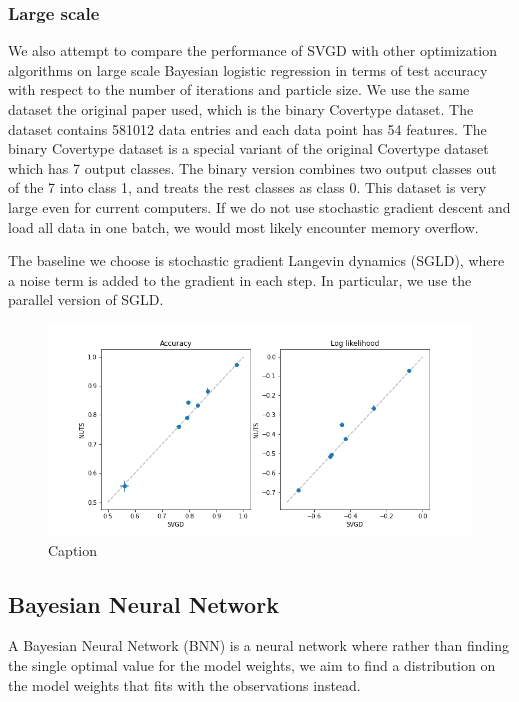 \subsubsection{Large scale}
We also attempt to compare the performance of SVGD with other optimization algorithms on large scale Bayesian logistic regression in terms of test accuracy with respect to the number of iterations and particle size. We use the same dataset the original paper used, which is the binary Covertype dataset. The dataset contains 581012 data entries and each data point has 54 features. The binary Covertype dataset is a special variant of the original Covertype dataset which has 7 output classes. The binary version combines two output classes out of the 7 into class 1, and treats the rest classes as class 0. This dataset is very large even for current computers. If we do not use stochastic gradient descent and load all data in one batch, we would most likely encounter memory overflow. 

The baseline we choose is stochastic gradient Langevin dynamics (SGLD), where a noise term is added to the gradient in each step. In particular, we use the parallel version of SGLD. 



\begin{figure}[h]
    \centering
    \includegraphics[width=\textwidth]{figs/logistic_svgd_nuts.png}
    \caption{Caption}
    \label{fig:logist_small}
\end{figure}

\subsection{Bayesian Neural Network}

A Bayesian Neural Network (BNN) is a neural network where rather than finding the single optimal value for the model weights, we aim to find a distribution on the model weights that fits with the observations instead.

